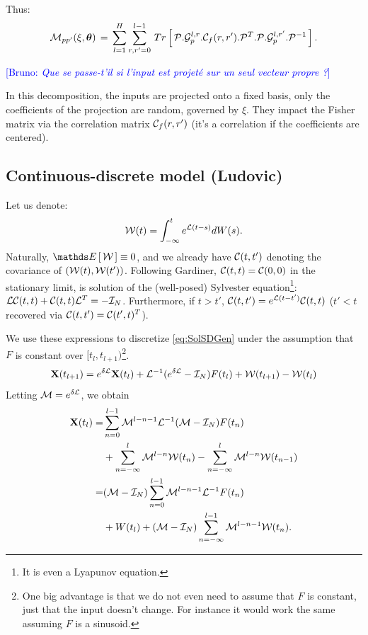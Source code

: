 \documentclass{article}
\newcommand{\B}[1]{{\textcolor{blue}{[Bruno: \textit{#1}]}}}
\newcommand{\ludo}{\color{Brown}}
\begin{document}
Thus:
%
\begin{equation}\label{eq:Fisher_Propre}
{\mathcal M}_{pp'}(\xi,\boldsymbol{\theta})\,=\,  \sum_{l=1}^H \sum_{r,r'=0}^{l-1} \, Tr\left[\, 
{\mathcal P}.{\mathcal G}^{l,r}_p.{\mathcal C}_f(r,r').{\mathcal P}^T.{\mathcal P}.{\mathcal G}^{l,r'}_p.{\mathcal P}^{-1}
 \, \right].
\end{equation}

\B{Que se passe-t'il si l'input est projeté sur un seul vecteur propre ?}

In this decomposition, the inputs are  projected onto a fixed basis, only the coefficients of the projection are random, governed by $\xi$.
They impact the Fisher matrix via the correlation matrix ${\mathcal C}_f(r,r')$ (it's a correlation if the coefficients are centered). 





\subsection{Continuous-discrete model (Ludovic)}

Let us denote:
%
\begin{equation}
    {\mathcal W}(t)=\int_{-\infty}^t e^{{\mathcal L}(t-s)}d W(s).
\end{equation}
%
Naturally, $\Exp{}\cW\equiv0$, and we already have ${\mathcal C}(t,t')$ denoting the covariance of $({\mathcal W}(t),{\mathcal W}(t'))$. Following Gardiner, ${\mathcal C}(t,t)={\mathcal C}(0,0)$ in the stationary limit, is solution of the (well-posed) Sylvester equation\footnote{It is even a Lyapunov equation.}: ${\mathcal L}{\mathcal C}(t,t)+{\mathcal C}(t,t){\mathcal L}^{T}=-{\mathcal I}_N$. Furthermore, if $t>t'$,
${\mathcal C}(t,t')=e^{{\mathcal L}(t-t')}{\mathcal C}(t,t)$ ($t'<t$ recovered via ${\mathcal C}(t,t')={\mathcal C}(t',t)^T$).

We use these expressions to discretize \eqref{eq:SolSDGen} under the assumption that $F$ is constant over $[t_l,t_{l+1})$\footnote{One big advantage is that we do not even need to assume that $F$ is constant, just that the input doesn't change. For instance it would work the same assuming $F$ is a sinusoid.}.
\begin{equation}
    \bold{X}(t_{l+1})=e^{\delta{\mathcal L}}\bold{X}(t_{l})+{\mathcal L}^{-1}(e^{\delta{\mathcal L}}-{\mathcal I}_N)F(t_l)+{\mathcal W}(t_{l+1})-{\mathcal W}(t_{l})
\end{equation}
Letting ${\mathcal M}=e^{\delta{\mathcal L}}$, we obtain 
\begin{equation}
\begin{aligned}
    \bold{X}(t_{l})=&\sum_{n=0}^{l-1}{\mathcal M}^{l-n-1}{\mathcal L}^{-1}({\mathcal M}-{\mathcal I}_N)F(t_n)
    \\
    &+\sum_{n=-\infty}^{l}{\mathcal M}^{l-n}{\mathcal W}(t_{n})-\sum_{n=-\infty}^{l}{\mathcal M}^{l-n}{\mathcal W}(t_{n-1})
    \\
    =&({\mathcal M}-{\mathcal I}_N)\sum_{n=0}^{l-1}{\mathcal M}^{l-n-1}{\mathcal L}^{-1}F(t_n)
    \\
    &+W(t_l)+({\mathcal M}-{\mathcal I}_N)\sum_{n=-\infty}^{l-1}{\mathcal M}^{l-n-1}{\mathcal W}(t_{n}).
\end{aligned}
\end{equation}
\end{document}

